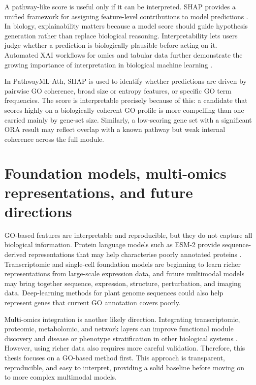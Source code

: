 \documentclass[12pt,letterpaper,oneside,openany]{book}
\begin{document}
A pathway-like score is useful only if it can be interpreted. SHAP provides a unified framework for assigning feature-level contributions to model predictions \citep{lundberg2017unified}. In biology, explainability matters because a model score should guide hypothesis generation rather than replace biological reasoning. Interpretability lets users judge whether a prediction is biologically plausible before acting on it. Automated XAI workflows for omics and tabular data further demonstrate the growing importance of interpretation in biological machine learning \citep{strudwick2025autoxai4omics}.

In PathwayML-Ath, SHAP is used to identify whether predictions are driven by pairwise GO coherence, broad size or entropy features, or specific GO term frequencies. The score is interpretable precisely because of this: a candidate that scores highly on a biologically coherent GO profile is more compelling than one carried mainly by gene-set size. Similarly, a low-scoring gene set with a significant ORA result may reflect overlap with a known pathway but weak internal coherence across the full module.

\section{Foundation models, multi-omics representations, and future directions}
\label{sec:lit_future}

GO-based features are interpretable and reproducible, but they do not capture all biological information. Protein language models such as ESM-2 provide sequence-derived representations that may help characterise poorly annotated proteins \citep{lin2023evolutionary}. Transcriptomic and single-cell foundation models are beginning to learn richer representations from large-scale expression data, and future multimodal models may bring together sequence, expression, structure, perturbation, and imaging data. Deep-learning methods for plant genome sequences could also help represent genes that current GO annotation covers poorly.

Multi-omics integration is another likely direction. Integrating transcriptomic, proteomic, metabolomic, and network layers can improve functional module discovery and disease or phenotype stratification in other biological systems \citep{hasin2017multiomics}. However, using richer data also requires more careful validation. Therefore, this thesis focuses on a GO-based method first. This approach is transparent, reproducible, and easy to interpret, providing a solid baseline before moving on to more complex multimodal models.
\end{document}
